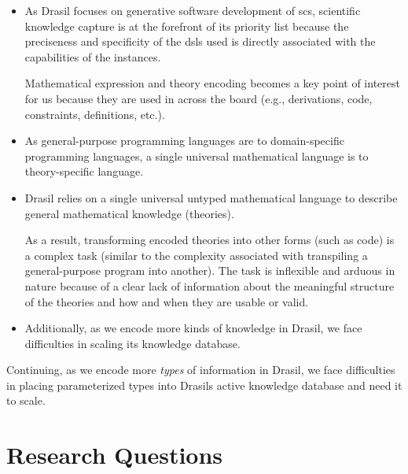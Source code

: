 \begin{itemize}

      \item As Drasil focuses on generative software development of \acs{scs},
            scientific knowledge capture is at the forefront of its priority
            list because the preciseness and specificity of the \acsp{dsl} used
            is directly associated with the capabilities of the instances.

            Mathematical expression and theory encoding becomes a key point of
            interest for us because they are used in across the board (e.g.,
            derivations, code, constraints, definitions, etc.).

      \item As general-purpose programming languages are to domain-specific
            programming languages, a single universal mathematical language is
            to theory-specific language.

      \item Drasil relies on a single universal untyped mathematical language to
            describe general mathematical knowledge (theories).

            As a result, transforming encoded theories into other forms (such as
            code) is a complex task (similar to the complexity associated with
            transpiling a general-purpose program into another). The task is
            inflexible and arduous in nature because of a clear lack of
            information about the meaningful structure of the theories and how
            and when they are usable or valid.

      \item Additionally, as we encode more kinds of knowledge in Drasil, we
            face difficulties in scaling its knowledge database.

\end{itemize}

Continuing, as we encode more \textit{types} of information in Drasil, we face
difficulties in placing parameterized types into Drasils active knowledge
database and need it to scale.

\section{Research Questions}
\label{sec:intro:researchquestions}

